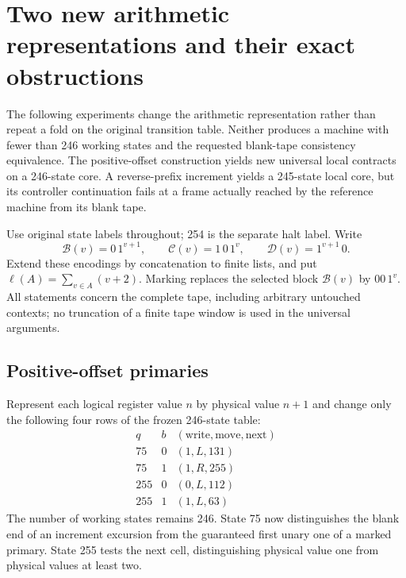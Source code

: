 \section{Two new arithmetic representations and their exact obstructions}
\label{sec:runtime-new}

The following experiments change the arithmetic representation rather than
repeat a fold on the original transition table.  Neither produces a machine
with fewer than 246 working states and the requested blank-tape consistency
equivalence.  The positive-offset construction yields new universal local
contracts on a 246-state core.  A reverse-prefix increment yields a 245-state
local core, but its controller continuation fails at a frame actually reached
by the reference machine from its blank tape.

Use original state labels throughout; 254 is the separate halt label.  Write
\[
 \mathcal B(v)=0\,1^{v+1},\qquad
 \mathcal C(v)=1\,0\,1^v,\qquad
 \mathcal D(v)=1^{v+1}\,0.
\]
Extend these encodings by concatenation to finite lists, and put
$\ell(A)=\sum_{v\in A}(v+2)$.  Marking replaces the selected block
$\mathcal B(v)$ by $00\,1^v$.  All statements concern the complete tape,
including arbitrary untouched contexts; no truncation of a finite tape
window is used in the universal arguments.

\subsection{Positive-offset primaries}

Represent each logical register value $n$ by physical value $n+1$ and change
only the following four rows of the frozen 246-state table:
\[
\begin{array}{c|c|c}
q&b&(\text{write},\text{move},\text{next})\\\hline
75&0&(1,L,131)\\
75&1&(1,R,255)\\
255&0&(0,L,112)\\
255&1&(1,L,63)
\end{array}
\]
The number of working states remains 246.  State 75 now distinguishes the
blank end of an increment excursion from the guaranteed first unary one of
a marked primary.  State 255 tests the next cell, distinguishing physical
value one from physical values at least two.

